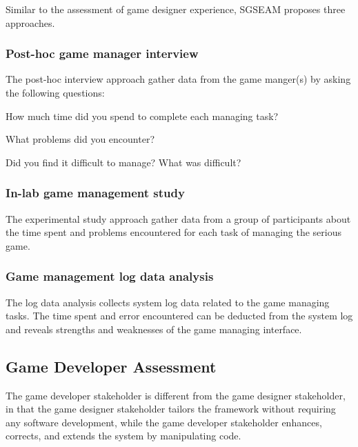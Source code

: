 Similar to the assessment of game designer experience, SGSEAM proposes three approaches. 

\subsubsection{Post-hoc game manager interview}
\label{Post-hoc game manager interview}

The post-hoc interview approach gather data from the game manger(s) by asking the following questions:\\
 
\begin{compactitem}
\item How much time did you spend to complete each managing task?
\item What problems did you encounter?
\item Did you find it difficult to manage? What was difficult?\\
\end{compactitem}

\subsubsection{In-lab game management study}
\label{In-lab game management study}

The experimental study approach gather data from a group of participants about the time spent and
problems encountered for each task of managing the serious game. 

\subsubsection{Game management log data analysis}
\label{Game management log data analysis}

The log data analysis collects system log data related to the game managing tasks. The time spent and error encountered can be deducted from the system log and reveals strengths and weaknesses of the game managing interface.

\subsection{Game Developer Assessment}

The game developer stakeholder is different from the game designer stakeholder, in that the
game designer stakeholder tailors the framework without requiring any software
development, while the game developer stakeholder enhances, corrects, and extends the system by
manipulating code. 


